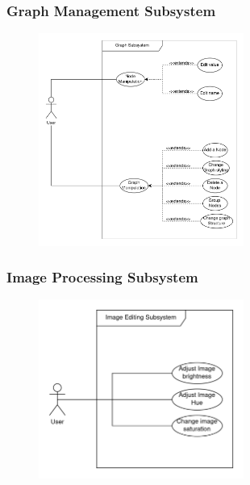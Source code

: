 \documentclass[11pt,a4paper]{article}
\begin{document}
\subsubsection*{Graph Management Subsystem}
\begin{figure}[htbp]
    \centering
    \includegraphics[width=0.6\textwidth]{../diagramPng/Usecase Graph-Subsystem.png}
\end{figure}

\pagebreak
\subsubsection*{Image Processing Subsystem}
\begin{figure}[htbp]
    \centering
    \includegraphics[width=0.6\textwidth]{../diagramPng/UseCase Image-Subsystem.png}
\end{figure}
\end{document}
